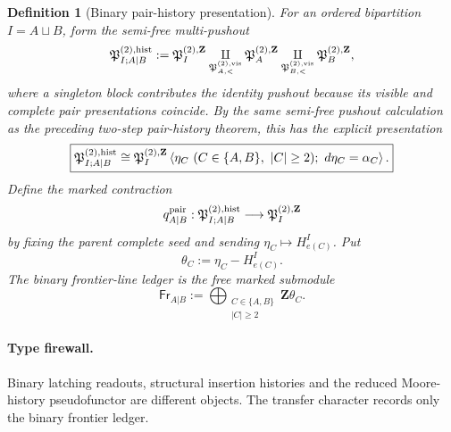 \documentclass[11pt]{article}
\newtheorem{definition}[theorem]{Definition}
\theoremstyle{remark}
\newcommand{\Z}{\mathbf Z}
\begin{document}
\begin{definition}[Binary pair-history presentation]
\label{P2M-def:v18-binary-pair-history}
For an ordered bipartition $I=A\sqcup B$, form the semi-free multi-pushout
\begin{equation}
 \mathfrak P_{I;A|B}^{(2),\rm hist}
 :=
 \mathfrak P_I^{(2),\Z}
 \underset{\mathfrak P_{A,<}^{(2),\rm vis}}{\amalg}
 \mathfrak P_A^{(2),\Z}
 \underset{\mathfrak P_{B,<}^{(2),\rm vis}}{\amalg}
 \mathfrak P_B^{(2),\Z},
\end{equation}
where a singleton block contributes the identity pushout because its visible
and complete pair presentations coincide.  By the same semi-free pushout
calculation as the preceding two-step pair-history theorem, this has the
explicit presentation
\begin{equation}
 \boxed{
 \mathfrak P_{I;A|B}^{(2),\rm hist}
 \cong\mathfrak P_I^{(2),\Z}
 \left\langle
   \eta_C\ (C\in\{A,B\},\ |C|\ge2);\
   d\eta_C=\alpha_C
 \right\rangle.}
\end{equation}
Define the marked contraction
\begin{equation}
 q_{A|B}^{\rm pair}:
 \mathfrak P_{I;A|B}^{(2),\rm hist}
 \longrightarrow
 \mathfrak P_I^{(2),\Z}
\end{equation}
by fixing the parent complete seed and sending
$\eta_C\mapsto H_{e(C)}^I$.  Put
\begin{equation}
 \theta_C:=\eta_C-H_{e(C)}^I.
\end{equation}
The \emph{binary frontier-line ledger} is the free marked submodule
\begin{equation}
 \mathsf{Fr}_{A|B}:=
 \bigoplus_{\substack{C\in\{A,B\}\\ |C|\ge2}}
 \Z\theta_C.
\end{equation}
\end{definition}

\paragraph{Type firewall.}
Binary latching readouts, structural insertion histories and the reduced
Moore-history pseudofunctor are different objects.  The transfer character
records only the binary frontier ledger.
\end{document}
